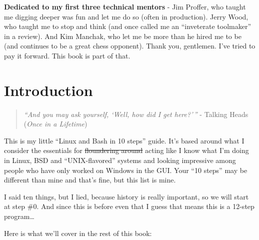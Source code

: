 \documentclass[10pt,]{book}
\numberwithin{figure}{chapter}
\begin{document}
\fi

\textbf{Dedicated to my first three technical mentors} - Jim Proffer,
who taught me digging deeper was fun and let me do so (often in
production). Jerry Wood, who taught me to stop and think (and once
called me an ``inveterate toolmaker'' in a review). And Kim Manchak, who
let me be more than he hired me to be (and continues to be a great chess
opponent). Thank you, gentlemen. I've tried to pay it forward. This book
is part of that.

\ifxetex
\setcounter{chapter}{-2} \fi

\chapter{Introduction}\label{introduction}

\begin{quote}
\emph{``And you may ask yourself, `Well, how did I get here?'\,''} -
Talking Heads (\emph{Once in a Lifetime})
\end{quote}

This is my little ``Linux and Bash in 10 steps'' guide. It's based
around what I consider the essentials for \sout{floundering around}
acting like I know what I'm doing in Linux, BSD and ``UNIX-flavored''
systems and looking impressive among people who have only worked on
Windows in the GUI. Your ``10 steps'' may be different than mine and
that's fine, but this list is mine.

I said ten things, but I lied, because history is really important, so
we will start at step \#0. And since this is before even that I guess
that means this is a 12-step program\ldots{}

Here is what we'll cover in the rest of this book:
\end{document}
